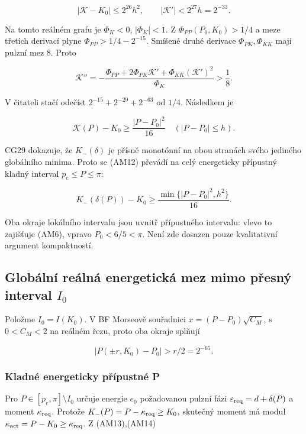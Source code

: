 \documentclass[11pt,a4paper]{article}
\theoremstyle{remark}\newtheorem{remark}[theorem]{Poznámka}
\numberwithin{equation}{section}
\begin{document}
\[
|\mathcal K-K_0|\le2^{26}h^2,
\qquad |\mathcal K'|<2^{27}h=2^{-33}.
\tag{AM10}
\]

Na tomto reálném grafu je \(\Phi_K<0\), \(|\Phi_K|<1\). Z
\(\Phi_{PP}(P_0,K_0)>1/4\) a meze třetích derivací plyne
\(\Phi_{PP}>1/4-2^{-15}\). Smíšené druhé derivace
\(\Phi_{PK},\Phi_{KK}\) mají pulzní mez 8. Proto

\[
\mathcal K''
=-\frac{\Phi_{PP}+2\Phi_{PK}\mathcal K'
               +\Phi_{KK}(\mathcal K')^2}{\Phi_K}
>\frac18.
\tag{AM11}
\]

V čitateli stačí odečíst \(2^{-15}+2^{-29}+2^{-63}\) od \(1/4\).
Následkem je

\[
\mathcal K(P)-K_0\ge\frac{|P-P_0|^2}{16}
\quad (|P-P_0|\le h).
\tag{AM12}
\]

CG29 dokazuje, že \(K_-(\delta)\) je přísně monotónní na obou stranách
svého jediného globálního minima. Proto se (AM12) převádí na celý
energeticky přípustný kladný interval \(p_e\le P\le\pi\):

\[
K_-(\delta(P))-K_0
\ge\frac{\min\{|P-P_0|^2,h^2\}}{16}.
\tag{AM13}
\]

Oba okraje lokálního intervalu jsou uvnitř přípustného intervalu: vlevo
to zajišťuje (AM6), vpravo \(P_0<6/5<\pi\). Není zde dosazen pouze
kvalitativní argument kompaktností.

\hypertarget{globuxe1lnuxed-reuxe1lnuxe1-energetickuxe1-mez-mimo-pux159esnuxfd-interval-i_0}{%
\subsection{\texorpdfstring{Globální reálná energetická mez mimo přesný
interval
\(I_0\)}{Globální reálná energetická mez mimo přesný interval I\_0}}\label{globuxe1lnuxed-reuxe1lnuxe1-energetickuxe1-mez-mimo-pux159esnuxfd-interval-i_0}}

Položme \(I_0=I(K_0)\). V BF Morseově souřadnici
\(x=(P-P_0)\sqrt{C_M}\), s \(0<C_M<2\) na reálném řezu, proto oba okraje
splňují

\[
|P(\pm r,K_0)-P_0|>r/2=2^{-65}.
\tag{AM14}
\]

\hypertarget{kladnuxe9-energeticky-pux159uxedpustnuxe9-p}{%
\subsubsection{Kladné energeticky přípustné
P}\label{kladnuxe9-energeticky-pux159uxedpustnuxe9-p}}

Pro \(P\in[p_e,\pi]\setminus I_0\) určuje energie \(e_0\) požadovanou
pulzní fázi \(\varepsilon_{\rm req}=d+\delta(P)\) a moment
\(\kappa_{\rm req}\). Protože \(K_-(P)=P-\kappa_{\rm req}\ge K_0\),
skutečný moment má modul \(\kappa_{\rm act}=P-K_0\ge\kappa_{\rm req}\).
Z (AM13),(AM14)
\end{document}
